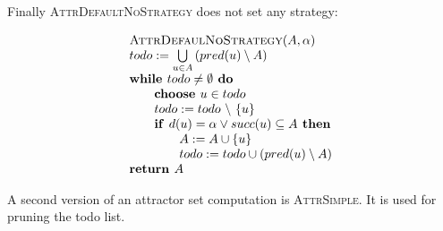 \documentclass{article}
\newcommand{\If}{\text{\textbf{if }}}
\newcommand{\Do}{\text{\textbf{ do }}}
\newcommand{\Then}{\text{\textbf{ then }}}
\newcommand{\While}{\text{\textbf{while }}}
\newcommand{\Choose}{\text{\textbf{choose }}}
\newcommand{\Return}{\text{\textbf{return }}}
\begin{document}
Finally \textsc{AttrDefaultNoStrategy} does not set any strategy:

\begin{equation*}
\begin{array}{l}
\textsc{AttrDefaulNoStrategy}(A,\alpha) \\ 
todo:=\bigcup\limits_{u\in A}\left( pred(u)\setminus A\right)  \\ 
\While todo\neq \emptyset \Do \\ 
\qquad \Choose u\in todo \\ 
\qquad todo:=todo\ \backslash \ \{u\} \\ 
\qquad \If d(u) = \alpha \vee succ(u)\subseteq A \Then \\ 
\qquad \qquad A:=A\cup \{u\} \\ 
\qquad \qquad todo:=todo\cup \left( pred(u)\setminus A\right)  \\ 
\Return A
\end{array}
\end{equation*}


%

A second version of an attractor set computation is \textsc{AttrSimple}. It is used for pruning the todo list.
\end{document}
